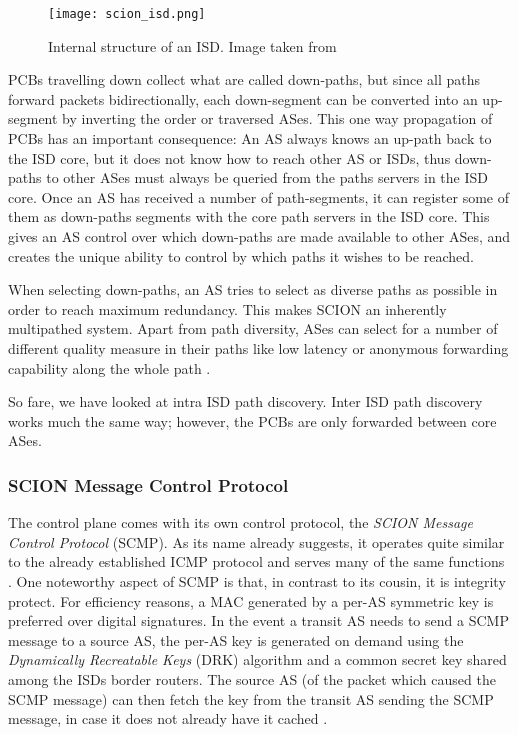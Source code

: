 \documentclass[../eva1_scion.tex]{subfiles}
\begin{document}
    \begin{figure}[ht]
        \centering
        \texttt{[image: scion\_isd.png]}
        \caption{Internal structure of an ISD. Image taken from \cite{scion_2015}}
        \label{fig:isd}
    \end{figure}

    PCBs travelling down collect what are called down-paths, but since all paths forward packets bidirectionally, each down-segment can be converted into an up-segment by inverting the order or traversed ASes. This one way propagation of PCBs has an important consequence: An AS always knows an up-path back to the ISD core, but it does not know how to reach other AS or ISDs, thus down-paths to other ASes must always be queried from the paths servers in the ISD core. Once an AS has received a number of path-segments, it can register some of them as down-paths segments with the core path servers in the ISD core. This gives an AS control over which down-paths are made available to other ASes, and creates the unique ability to control by which paths it wishes to be reached.

    When selecting down-paths, an AS tries to select as diverse paths as possible in order to reach maximum redundancy. This makes SCION an inherently multipathed system. Apart from path diversity, ASes can select for a number of different quality measure in their paths like low latency or anonymous forwarding capability along the whole path \cite{scion_2011}.

    So fare, we have looked at intra ISD path discovery. Inter ISD path discovery works much the same way; however, the PCBs are only forwarded between core ASes.

    \subsubsection{SCION Message Control Protocol} \label{sssec:scmp}
    The control plane comes with its own control protocol, the \textit{SCION Message Control Protocol} (SCMP). As its name already suggests, it operates quite similar to the already established ICMP protocol and serves many of the same functions \cite{scion_2015}. One noteworthy aspect of SCMP is that, in contrast to its cousin, it is integrity protect. For efficiency reasons, a MAC generated by a per-AS symmetric key is preferred over digital signatures. In the event a transit AS needs to send a SCMP message to a source AS, the per-AS key is generated on demand using the \textit{Dynamically Recreatable Keys} (DRK) algorithm and a common secret key shared among the ISDs border routers. The source AS (of the packet which caused the SCMP message) can then fetch the key from the transit AS sending the SCMP message, in case it does not already have it cached \cite{scion_2015}. 
\end{document}
